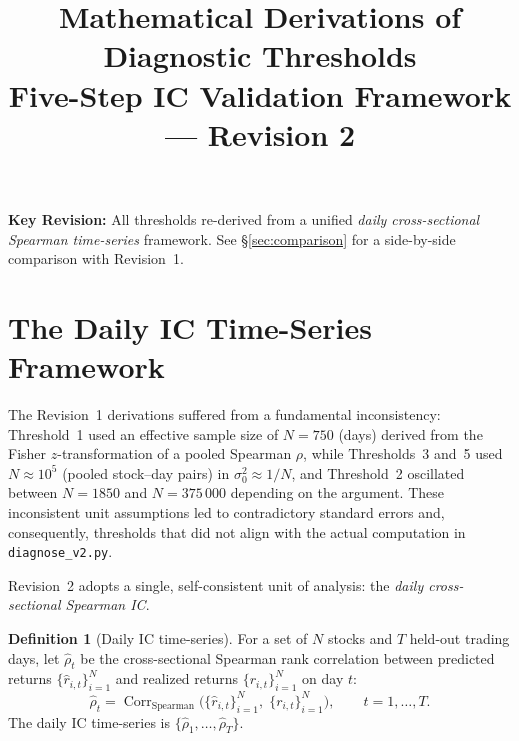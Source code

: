 \documentclass[11pt,a4paper]{article}
\theoremstyle{definition}
\newtheorem{definition}{Definition}[section]
\newcommand{\Corr}{\operatorname{Corr}}
\begin{document}
\title{\textbf{Mathematical Derivations of Diagnostic Thresholds}\\
       \large Five-Step IC Validation Framework --- Revision 2}
\author{}
\date{}
\maketitle

\vspace{-8pt}
\begin{center}
\small\textbf{Key Revision:} All thresholds re-derived from a unified
\emph{daily cross-sectional Spearman time-series} framework.
See \S\ref{sec:comparison} for a side-by-side comparison with Revision~1.
\end{center}

\section{The Daily IC Time-Series Framework}
\label{sec:framework}

The Revision~1 derivations suffered from a fundamental inconsistency:
Threshold~1 used an effective sample size of $N=750$ (days) derived from
the Fisher $z$-transformation of a pooled Spearman $\rho$, while
Thresholds~3 and~5 used $N \approx 10^{5}$ (pooled stock--day pairs) in
$\sigma_{0}^{2} \approx 1/N$, and Threshold~2 oscillated between $N=1850$
and $N=375\,000$ depending on the argument. These inconsistent unit
assumptions led to contradictory standard errors and, consequently,
thresholds that did not align with the actual computation in
\texttt{diagnose\_v2.py}.

Revision~2 adopts a single, self-consistent unit of analysis: the
\emph{daily cross-sectional Spearman IC}.

\begin{definition}[Daily IC time-series]
\label{def:daily_ic}
For a set of $N$ stocks and $T$ held-out trading days, let
$\hat{\rho}_{t}$ be the cross-sectional Spearman rank correlation
between predicted returns $\{\hat{r}_{i,t}\}_{i=1}^{N}$ and realized
returns $\{r_{i,t}\}_{i=1}^{N}$ on day $t$:
\begin{equation}
    \hat{\rho}_{t} = \Corr_{\text{Spearman}}\!
                    \bigl(\{\hat{r}_{i,t}\}_{i=1}^{N},\;
                          \{r_{i,t}\}_{i=1}^{N}\bigr),
    \qquad t = 1,\dots,T.
    \label{eq:daily_ic}
\end{equation}
The daily IC time-series is $\{\hat{\rho}_{1},\dots,\hat{\rho}_{T}\}$.
\end{definition}
\end{document}
